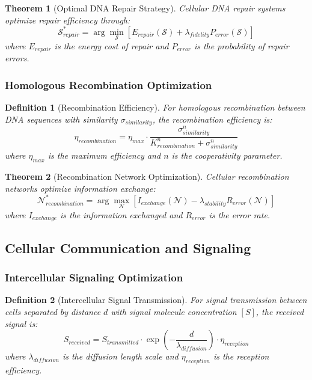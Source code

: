 \documentclass[12pt,a4paper]{article}
\newtheorem{theorem}{Theorem}
\newtheorem{definition}{Definition}
\begin{document}
\begin{theorem}[Optimal DNA Repair Strategy]
Cellular DNA repair systems optimize repair efficiency through:
\begin{equation}
\mathcal{S}_{repair}^* = \arg\min_{\mathcal{S}} \left[ E_{repair}(\mathcal{S}) + \lambda_{fidelity} P_{error}(\mathcal{S}) \right]
\end{equation}
where $E_{repair}$ is the energy cost of repair and $P_{error}$ is the probability of repair errors.
\end{theorem}

\subsubsection{Homologous Recombination Optimization}

\begin{definition}[Recombination Efficiency]
For homologous recombination between DNA sequences with similarity $\sigma_{similarity}$, the recombination efficiency is:
\begin{equation}
\eta_{recombination} = \eta_{max} \cdot \frac{\sigma_{similarity}^n}{K_{recombination}^n + \sigma_{similarity}^n}
\end{equation}
where $\eta_{max}$ is the maximum efficiency and $n$ is the cooperativity parameter.
\end{definition}

\begin{theorem}[Recombination Network Optimization]
Cellular recombination networks optimize information exchange:
\begin{equation}
\mathcal{N}_{recombination}^* = \arg\max_{\mathcal{N}} \left[ I_{exchange}(\mathcal{N}) - \lambda_{stability} R_{error}(\mathcal{N}) \right]
\end{equation}
where $I_{exchange}$ is the information exchanged and $R_{error}$ is the error rate.
\end{theorem}

\subsection{Cellular Communication and Signaling}

\subsubsection{Intercellular Signaling Optimization}

\begin{definition}[Intercellular Signal Transmission]
For signal transmission between cells separated by distance $d$ with signal molecule concentration $[S]$, the received signal is:
\begin{equation}
S_{received} = S_{transmitted} \cdot \exp\left(-\frac{d}{\lambda_{diffusion}}\right) \cdot \eta_{reception}
\end{equation}
where $\lambda_{diffusion}$ is the diffusion length scale and $\eta_{reception}$ is the reception efficiency.
\end{definition}
\end{document}

